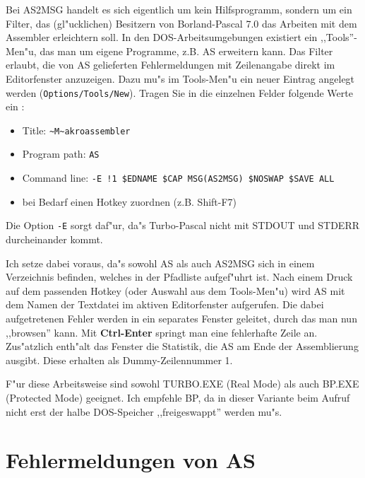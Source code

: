 \documentclass[12pt,a4paper,twoside]{report}
\newcommand{\bb}[1]{{\bf #1}}
\newcommand{\tty}[1]{{\tt #1}}
\begin{document}
{Bei AS2MSG handelt es sich eigentlich um kein Hilfsprogramm, sondern um ein
Filter, das (gl"ucklichen) Besitzern von Borland-Pascal 7.0 das Arbeiten
mit dem Assembler erleichtern soll.  In den DOS-Arbeitsumgebungen existiert
ein ,,Tools''-Men"u, das man um eigene Programme, z.B. AS erweitern kann.
Das Filter erlaubt, die von AS gelieferten Fehlermeldungen mit Zeilenangabe
direkt im Editorfenster anzuzeigen.  Dazu mu"s im Tools-Men"u ein neuer
Eintrag angelegt werden (\tty{Options/Tools/New}).  Tragen Sie in die
einzelnen Felder folgende Werte ein :
\begin{itemize}
\item{Title: {\tt \verb!~!M\verb!~!akroassembler}}
\item{Program path: \tty{AS}}
\item{Command line: \tty{-E !1 \$EDNAME \$CAP MSG(AS2MSG) \$NOSWAP \$SAVE
ALL}}
\item{bei Bedarf einen Hotkey zuordnen (z.B. Shift-F7)}
\end{itemize}
Die Option \tty{-E} sorgt daf"ur, da"s Turbo-Pascal nicht mit STDOUT und
STDERR durcheinander kommt.
\par
Ich setze dabei voraus, da"s sowohl AS als auch AS2MSG sich in einem
Verzeichnis befinden, welches in der Pfadliste aufgef"uhrt ist.  Nach einem
Druck auf dem passenden Hotkey (oder Auswahl aus dem Tools-Men"u) wird AS mit
dem Namen der Textdatei im aktiven Editorfenster aufgerufen.  Die dabei
aufgetretenen Fehler werden in ein separates Fenster geleitet, durch das man
nun ,,browsen'' kann.  Mit \bb{Ctrl-Enter} springt man eine fehlerhafte
Zeile an.  Zus"atzlich enth"alt das Fenster die Statistik, die AS am Ende
der Assemblierung ausgibt.  Diese erhalten als Dummy-Zeilennummer 1.
\par
F"ur diese Arbeitsweise sind sowohl TURBO.EXE (Real Mode) als auch BP.EXE
(Protected Mode) geeignet.  Ich empfehle BP, da in dieser Variante beim
Aufruf nicht erst der halbe DOS-Speicher ,,freigeswappt'' werden mu"s.

\cleardoublepage

\appendix
 

\cleardoublepage
\chapter{Fehlermeldungen von AS}
\label{ChapErrMess}

}
\end{document}
